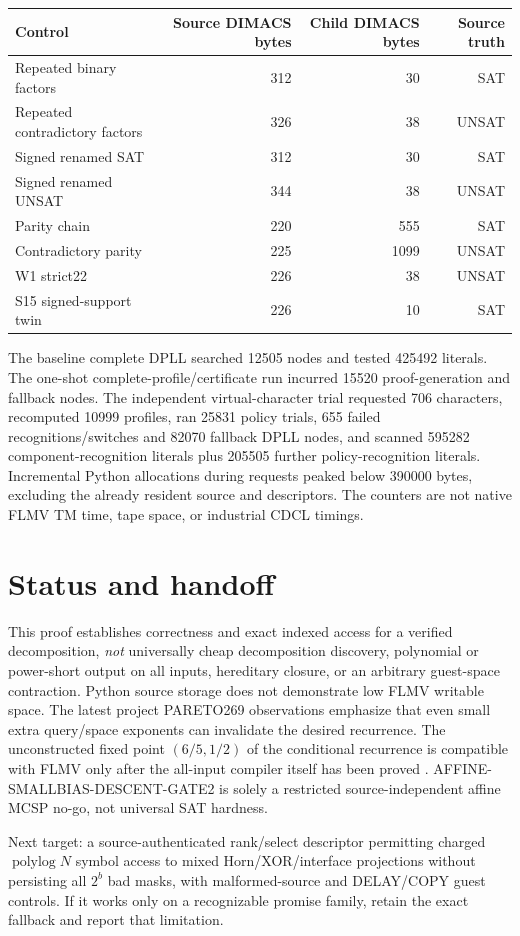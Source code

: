 \documentclass[11pt]{article}
\begin{document}
\begin{center}
\begin{tabular}{lrrr}
\toprule
Control & Source DIMACS bytes & Child DIMACS bytes & Source truth\\
\midrule
Repeated binary factors & 312 & 30 & SAT\\
Repeated contradictory factors & 326 & 38 & UNSAT\\
Signed renamed SAT & 312 & 30 & SAT\\
Signed renamed UNSAT & 344 & 38 & UNSAT\\
Parity chain & 220 & 555 & SAT\\
Contradictory parity & 225 & 1099 & UNSAT\\
W1 strict22 & 226 & 38 & UNSAT\\
S15 signed-support twin & 226 & 10 & SAT\\
\bottomrule
\end{tabular}
\end{center}
The baseline complete DPLL searched 12505 nodes and tested 425492 literals. The one-shot complete-profile/certificate run incurred 15520 proof-generation and fallback nodes. The independent virtual-character trial requested 706 characters, recomputed 10999 profiles, ran 25831 policy trials, 655 failed recognitions/switches and 82070 fallback DPLL nodes, and scanned 595282 component-recognition literals plus 205505 further policy-recognition literals. Incremental Python allocations during requests peaked below 390000 bytes, excluding the already resident source and descriptors. The counters are not native FLMV TM time, tape space, or industrial CDCL timings.

\section{Status and handoff}
This proof establishes correctness and exact indexed access for a verified decomposition, \emph{not} universally cheap decomposition discovery, polynomial or power-short output on all inputs, hereditary closure, or an arbitrary guest-space contraction. Python source storage does not demonstrate low FLMV writable space. The latest project PARETO269 observations emphasize that even small extra query/space exponents can invalidate the desired recurrence. The unconstructed fixed point $(6/5,1/2)$ of the conditional recurrence is compatible with FLMV only after the all-input compiler itself has been proved \cite{flmv2005}. AFFINE-SMALLBIAS-DESCENT-GATE2 is solely a restricted source-independent affine MCSP no-go, not universal SAT hardness.

Next target: a source-authenticated rank/select descriptor permitting charged $\operatorname{polylog}N$ symbol access to mixed Horn/XOR/interface projections without persisting all $2^b$ bad masks, with malformed-source and DELAY/COPY guest controls. If it works only on a recognizable promise family, retain the exact fallback and report that limitation.


\end{document}
